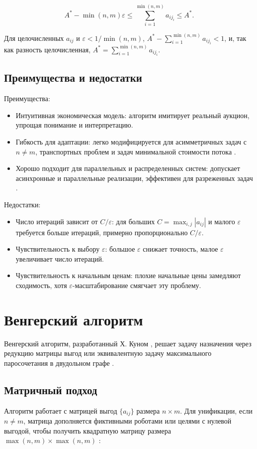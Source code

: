 \[
A^* - \min(n, m) \varepsilon \leq \sum_{i=1}^{\min(n, m)} a_{i j_i} \leq A^*.
\]

Для целочисленных \( a_{ij} \) и \( \varepsilon < 1/\min(n, m) \), \( A^* - \sum_{i=1}^{\min(n, m)} a_{i j_i} < 1 \), и, так как разность целочисленная, \( A^* = \sum_{i=1}^{\min(n, m)} a_{i j_i} \).

\subsection{Преимущества и недостатки}
Преимущества:
\begin{itemize}
    \item Интуитивная экономическая модель: алгоритм имитирует реальный аукцион, упрощая понимание и интерпретацию.
    \item Гибкость для адаптации: легко модифицируется для асимметричных задач с \( n \neq m \), транспортных проблем и задач минимальной стоимости потока \cite{bertsekas1990}.
    \item Хорошо подходит для параллельных и распределенных систем: допускает асинхронные и параллельные реализации, эффективен для разреженных задач \cite{gerkey2003}.
\end{itemize}

Недостатки:
\begin{itemize}
    \item Число итераций зависит от \( C / \varepsilon \): для больших \( C = \max_{i,j} |a_{ij}| \) и малого \( \varepsilon \) требуется больше итераций, примерно пропорционально \( C / \varepsilon \).
    \item Чувствительность к выбору \( \varepsilon \): большое \( \varepsilon \) снижает точность, малое \( \varepsilon \) увеличивает число итераций.
    \item Чувствительность к начальным ценам: плохие начальные цены замедляют сходимость, хотя \( \varepsilon \)-масштабирование смягчает эту проблему.
\end{itemize}

\section{Венгерский алгоритм}
Венгерский алгоритм, разработанный Х. Куном \cite{kuhn1955}, решает задачу назначения через редукцию матрицы выгод или эквивалентную задачу максимального паросочетания в двудольном графе \cite{emaxx2025}.

\subsection{Матричный подход}
Алгоритм работает с матрицей выгод \( \{a_{ij}\} \) размера \( n \times m \). Для унификации, если \( n \neq m \), матрица дополняется фиктивными роботами или целями с нулевой выгодой, чтобы получить квадратную матрицу размера \( \max(n, m) \times \max(n, m) \) \cite{kuhn1955}:

